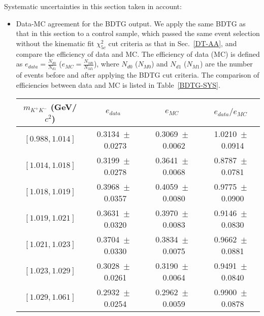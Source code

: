 \documentclass[aps,prd,twocolumn,showpacs,amsmath,amssymb]{revtex4-1}
\begin{document}
    Systematic uncertainties in this section taken in account:
    \begin{itemize}
        \item \uppercase\expandafter{} Data-MC agreement for the BDTG output. 
            We apply the same BDTG as that in this section
            to a control sample, 
            which passed the same event selection without the kinematic fit $\chi_{5c}^{2}$ cut criteria as that in  
            Sec.~\ref{DT-AA}, 
            and compare the efficiency of data and MC.
            The efficiency of data (MC) is defined as $e_{data} = \frac{N_{d0}}{N_{d1}}$ ($e_{MC} = \frac{N_{M0}}{N_{M1}}$), where $N_{d0}$ ($N_{M0}$) and $N_{d1}$ ($N_{M1}$) are the number of events before and after applying the BDTG cut criteria.
            The comparison of efficiencies between data and MC is listed in Table~\ref{BDTG-SYS}.
            \begin{table*}[htbp]
                \caption{The comparison of efficiencies between data and MC.}
                \label{BDTG-SYS}
                \begin{center}
                    \begin{tabular}{cccc}
                        \hline\hline
                        $m_{K^{+}K^{-}}$ (GeV/$c^{2}$) &  $e_{data} $ &  $e_{MC}$&  $e_{data} / e_{MC}$   \\
                        \hline
                        $[0.988, 1.014]$ &                0.3134\ $\pm$\ 0.0273 & 0.3069\ $\pm$\ 0.0062 & 1.0210\ $\pm$\ 0.0914 \\  
                        $[1.014, 1.018]$ &                0.3199\ $\pm$\ 0.0278 & 0.3641\ $\pm$\ 0.0068 & 0.8787\ $\pm$\ 0.0781 \\
                        $[1.018, 1.019]$ &                0.3968\ $\pm$\ 0.0357 & 0.4059\ $\pm$\ 0.0080 & 0.9775\ $\pm$\ 0.0900 \\
                        $[1.019, 1.021]$ &                0.3631\ $\pm$\ 0.0320 & 0.3970\ $\pm$\ 0.0083 & 0.9146\ $\pm$\ 0.0830 \\
                        $[1.021, 1.023]$ &                0.3704\ $\pm$\ 0.0330 & 0.3834\ $\pm$\ 0.0075 & 0.9662\ $\pm$\ 0.0881 \\
                        $[1.023, 1.029]$ &                0.3028\ $\pm$\ 0.0261 & 0.3190\ $\pm$\ 0.0064 & 0.9491\ $\pm$\ 0.0840 \\
                        $[1.029, 1.061]$ &                0.2932\ $\pm$\ 0.0254 & 0.2962\ $\pm$\ 0.0059 & 0.9900\ $\pm$\ 0.0878 \\

\end{tabular}
\end{center}
\end{table*}
\end{itemize}
\end{document}
